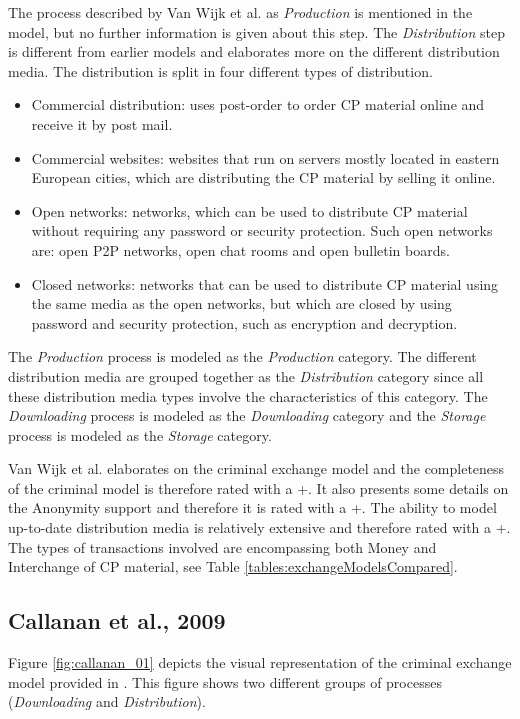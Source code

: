 \documentclass{sig-alternate-br}
\begin{document}
The process described by Van Wijk et al. as \textit{Production} is mentioned in the model, but no further information is given about this step. The \textit{Distribution} step is different from earlier models and elaborates more on the different distribution media. The distribution is split in four different types of distribution.
\begin{itemize}
	\item Commercial distribution: uses post-order to order CP material online and receive it by post mail. 
	\item Commercial websites: websites that run on servers mostly located in eastern European cities, which are distributing the CP material by selling it online.
	\item Open networks: networks, which can be used to distribute CP material without requiring any password or security protection. Such open networks are: open P2P networks, open chat rooms and open bulletin boards.
	\item Closed networks: networks that can be used to distribute CP material using the same media as the open networks, but which are closed by using password and security protection, such as encryption and decryption.
\end{itemize}

The \textit{Production} process is modeled as the \textit{Production} category. The different distribution media are grouped together as the \textit{Distribution} category since all these distribution media types involve the characteristics of this category. The \textit{Downloading} process is modeled as the \textit{Downloading} category and the \textit{Storage} process is modeled as the \textit{Storage} category.

Van Wijk et al. elaborates on the criminal exchange model and the completeness of the criminal model is therefore rated with a +. It also presents some details on the Anonymity support and therefore it is rated with a +. The ability to model up-to-date distribution media is relatively extensive and therefore rated with a +. The types of transactions involved are encompassing both Money and Interchange of CP material, see Table \ref{tables:exchangeModelsCompared}.

\subsection{Callanan et al., 2009 \cite{callanan2009internet}}
Figure \ref{fig:callanan_01} depicts the visual representation of the criminal exchange model provided in \cite{callanan2009internet}. This figure shows two different groups of processes (\textit{Downloading} and \textit{Distribution}).
\end{document}
